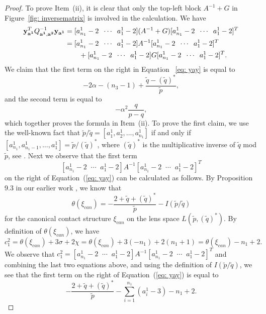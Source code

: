 \documentclass[11pt]{amsart}
\theoremstyle{plain}
\theoremstyle{definition}
\theoremstyle{remark}
\numberwithin{theorem}{section}
\begin{document}
\begin{proof}
To prove Item~(ii), it is clear that only the top-left block $A^{-1} + G$  in Figure~\ref{fig: inversematrix} is involved in the calculation. We have 
\begin{equation} \label{eq: yay}
\begin{split}
{\bf y}^T_{\bf a^1} Q^{-1}_{{\bf a^1}, {\bf a^2}} {\bf y_{a^1}} &=  [a^1_{n_1}-2 \;\;  \cdots \;\; a^1_1-2] (A^{-1} + G) [a^1_{n_1}-2 \;\; \cdots \;\; a^1_1-2]^T  \\
 & =[a^1_{n_1}-2 \;\; \cdots \;\; a^1_1-2] A^{-1} [a^1_{n_1}-2 \;\; \cdots \;\; a^1_1-2]^T\\  & 
 \quad\quad +[a^1_{n_1}-2 \;\; \cdots \;\; a^1_1-2] G [a^1_{n_1}-2 \;\;  \cdots \;\; a^1_1-2]^T. \\ \end{split}
\end{equation}
We claim that the first term on the right in Equation ~\eqref{eq: yay} is equal to 
\[ 
-2\alpha  -(n_3-1) + \dfrac{\widetilde{q} - (\widetilde{q})^*}{\widetilde{p}},
\] 
and the second term is equal to 
\[
- \alpha^2 \dfrac{q}{p-q},
\] 
which together proves the formula in Item~(ii). To prove the first claim, we use the well-known fact that $\widetilde{p}/\widetilde{q}=[a^1_1, a^1_2, \ldots, a^1_{n_1}]$  if and only if $[a^1_{n_1}, a^1_{n_1-1}, \ldots, a^1_1]=  \widetilde{p} /  (\widetilde{q})^*$, where $(\widetilde{q})^*$ is  the multiplicative inverse of  $\widetilde{q}$ mod $\widetilde{p}$, see \cite[Lemma~A4]{OrlikWagreich77}. Next we observe that the first term 
\[
[a^1_{n_1}-2 \;\; \cdots \;\; a^1_1-2] A^{-1} [a^1_{n_1}-2 \;\; \cdots \;\; a^1_1-2]^T
\] 
on the right of Equation~(\ref{eq: yay}) can be calculated as follows. By Proposition 9.3 in our earlier work \cite{EtnyreOzbagciTosun2025}, we know that $$\theta(\xi_{can})=   -\dfrac{2+\widetilde q+ (\widetilde{q})^*}{\widetilde{p}} -I(\widetilde{p} /  \widetilde{q}) $$ for the canonical contact structure $\xi_{can}$ on the lens space $L( \widetilde{p},  (\widetilde{q})^*)$. By definition of $\theta(\xi_{can})$, we have  $$c_1^2 = \theta(\xi_{can})+3 \sigma +2 \chi= \theta(\xi_{can})+3 (-n_1) 
+2(n_1+1)=\theta(\xi_{can})-n_1+2.$$ We observe that $c_1^2 = [a^1_{n_1}-2 \;\; \cdots \;\; a^1_1-2] A^{-1} [a^1_{n_1}-2 \;\; \cdots \;\; a^1_1-2]^T$ and combining the last two equations above, and using the definition of $I(\widetilde{p} /  \widetilde{q})$, we see that the first term on the right of Equation~(\ref{eq: yay}) is equal to
\begin{equation} \label{eq: contfrac}
 -\dfrac{2+\widetilde q+ (\widetilde{q})^*}{\widetilde{p}} - \sum_{i=1}^{n_1} (a^1_i -3) -n_1+2. 

\end{equation}
\end{proof}
\end{document}
